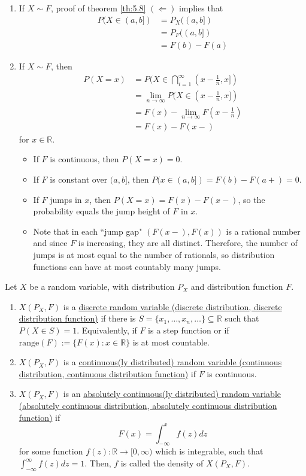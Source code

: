 \documentclass{article}
\newcommand{\R}{\mathbb{R}}
\begin{document}
	\begin{myrem}{}{}
		\begin{enumerate}
			\item If $X\sim F$, proof of theorem \ref{th:5.8} $(\Leftarrow)$ implies that
			\begin{align*}
				P(X\in(a, b])&=P_X((a, b])\\
				&=P_F((a, b])\\
				&=F(b)-F(a)
			\end{align*}
			
			\item If $X\sim F$, then 
			\begin{align*}
				P(X=x)&=P(X\in\bigcap_{i=1}^{\infty}(x-\frac{1}{n}, x])\\
				&=\lim_{n\to\infty}P(X\in(x-\frac{1}{n}, x])\\
				&=F(x)-\lim_{n\to\infty}F(x-\frac{1}{n})\\
				&=F(x)-F(x-)
			\end{align*}
			for $x\in\R$.
			\begin{itemize}
				\item If $F$ is continuous, then $P(X=x)=0$.
				\item If $F$ is constant over $(a, b]$, then $P(x\in(a, b])=F(b)-F(a+)=0$.
				\item If $F$ jumps in $x$, then $P(X=x)=F(x)-F(x-)$, so the probability equals the jump height of $F$ in $x$.
				\item Note that in each ``jump gap" $(F(x-), F(x))$ is a rational number and since $F$ is increasing, they are all distinct. Therefore, the number of jumps is at most equal to the number of rationals, so distribution functions can have at most countably many jumps.
			\end{itemize}
		\end{enumerate}
	\end{myrem}
	
	\begin{mydef}{}{}
		Let $X$ be a random variable, with distribution $P_X$ and distribution function $F$.
		\begin{enumerate}
			\item $X(P_X, F)$ is a \ul{discrete random variable (discrete distribution, discrete distribution function)} if there is $S=\{x_1, \dots, x_n, \dots\}\subseteq \R$ such that $P(X\in S)=1$. Equivalently, if $F$ is a step function or if $\mbox{range}(F):=\{F(x) : x\in\R\}$ is at most countable.
			
			\item $X(P_X, F)$ is a \ul{continuous(ly distributed) random variable (continuous distribution, continuous distribution function)} if $F$ is continuous.
			
			\item $X(P_X, F)$ is an \ul{absolutely continuous(ly distributed) random variable (absolutely continuous distribution, absolutely continuous distribution function)} if $$F(x)=\int_{-\infty}^{x}f(z)dz$$ for some function $f(z) : \R\to[0, \infty)$ which is integrable, such that $\int_{-\infty}^{\infty}f(z)dz=1$. Then, $f$ is called the density of $X(P_X, F)$.
		\end{enumerate}
	\end{mydef}
	
\end{document}
